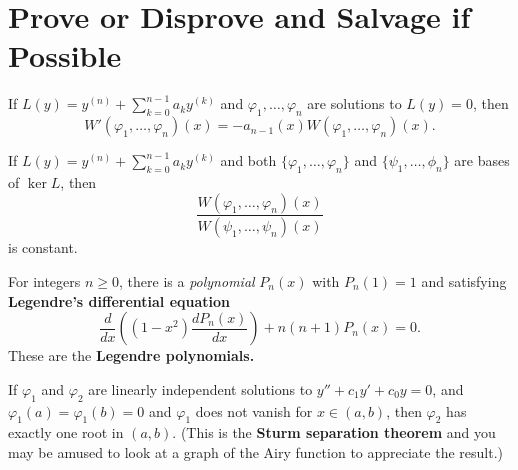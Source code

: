 \documentclass{homework}
\begin{document}
\section{Prove or Disprove and Salvage if Possible}

\begin{problem}
  If $L(y) = y^{(n)} + \sum_{k=0}^{n-1} a_k y^{(k)}$ and $\varphi_1,\ldots,\varphi_n$ are solutions to $L(y) = 0$, then
  \[
    W'(\varphi_1,\ldots,\varphi_n)(x) = - a_{n-1}(x) W(\varphi_1,\ldots,\varphi_n)(x).
  \]
\end{problem}

\begin{problem}
  If $L(y) = y^{(n)} + \sum_{k=0}^{n-1} a_k y^{(k)}$ and 
  both $\{\varphi_1,\ldots,\varphi_n\}$ and $\{\psi_1,\ldots,\phi_n\}$ are bases of $\ker L$, then
  \[
    \frac{W(\varphi_1,\ldots,\varphi_n)(x)}{W(\psi_1,\ldots,\psi_n)(x)}
  \]
  is constant.
\end{problem}

\begin{problem}For integers $n \geq 0$, there is a \textit{polynomial} $P_n(x)$ with $P_{n}(1)=1$ and satisfying
  \textbf{Legendre's differential equation}
  \[
    \frac{d}{dx}\left(\left(1-x^{2}\right){\frac {d P_{n}(x)}{dx}}\right)+n(n+1)P_{n}(x)=0.
  \]
  These are the \textbf{Legendre polynomials.}
\end{problem}

\begin{problem}
  If $\varphi_1$ and $\varphi_2$ are linearly independent solutions to
  $y'' + c_1 y' + c_0 y = 0$, and $\varphi_1(a) = \varphi_1(b) = 0$
  and $\varphi_1$ does not vanish for $x \in (a,b)$, then $\varphi_2$
  has exactly one root in $(a,b)$.  (This is the \textbf{Sturm
    separation theorem} and you may be amused to look at a graph of
  the Airy function to appreciate the result.)
\end{problem}
  
\end{document}
